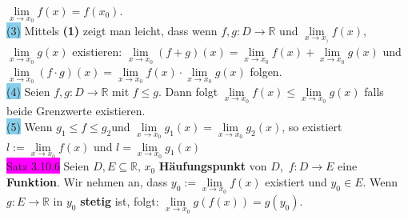 \documentclass[landscape, 10pt]{article}
\newcommand{\R}{\mathbb{R}}
\begin{document}
\begin{multicols}{3}
                            \textcolor{NavyBlue}{
                            $\lim\limits_{x\to x_0}f(x)=f(x_0)$}.\\
                     \colorbox{SkyBlue}{(3)} 
                            Mittels \textbf{(1)} zeigt man leicht, 
                            dass wenn 
                            \textcolor{NavyBlue}{$f,g:D\longrightarrow\R$} 
                            und 
                            \textcolor{NavyBlue}{
                            $\lim\limits_{x\to x_)}f(x),$\,
                            $\lim\limits_{x\to x_0}g(x)$}
                            existieren: 
                            \textcolor{NavyBlue}{$\lim\limits_{x\to x_0}(f+g)(x)
                            =\lim\limits_{x\to x_0}f(x)+\lim\limits_{x\to x_0}g(x)$} und
                            \textcolor{NavyBlue}{
                            $\lim\limits_{x\to x_0}(f\cdot g)(x)
                            =\lim\limits_{x\to x_0}f(x)\cdot\lim\limits_{x\to x_0}g(x)$} 
                            folgen.\\
                     \colorbox{SkyBlue}{(4)} 
                            Seien \textcolor{NavyBlue}{$f,g:D\longrightarrow\R$} mit 
                            \textcolor{NavyBlue}{$f\leqslant g$}. Dann folgt 
                            \textcolor{NavyBlue}{
                            $\lim\limits_{x\to x_0}f(x)
                            \leqslant\lim\limits_{x\to x_0}g(x)$}
                            falls beide Grenzwerte existieren.\\
                     \colorbox{SkyBlue}{(5)} 
                            Wenn \textcolor{NavyBlue}{
                            $g_1\leqslant f\leqslant g_2$}und 
                            \textcolor{NavyBlue}{
                            $\lim\limits_{x\to x_0}g_1(x)
                            =\lim\limits_{x\to x_0}g_2(x)$}, 
                            so existiert 
                            \textcolor{NavyBlue}{$l:=\lim\limits_{x\to x_0}f(x)$} 
                            und \textcolor{NavyBlue}{
                            $l=\lim\limits_{x\to x_0}g_1(x)$}\\
              \colorbox{magenta}{Satz 3.10.6} 
                     Seien \textcolor{NavyBlue}{$D,E\subseteq\R,\,x_0$} 
                     \textbf{Häufungspunkt} von 
                     \textcolor{NavyBlue}{$D$},\,
                     \textcolor{NavyBlue}{$f:D\longrightarrow E$} 
                     eine \textbf{Funktion}. Wir nehmen an, dass 
                     \textcolor{NavyBlue}{$y_0:=\lim\limits_{x\to x_0}f(x)$} 
                     existiert und 
                     \textcolor{NavyBlue}{$y_0\in E$}. Wenn 
                     \textcolor{NavyBlue}{$g:E\longrightarrow\R$} in 
                     \textcolor{NavyBlue}{$y_0$} \textbf{stetig} ist, folgt: 
                     \textcolor{NavyBlue}{
                     $\lim\limits_{x\to x_0}g(f(x))=g(y_0)$}.


\end{multicols}
\end{document}
